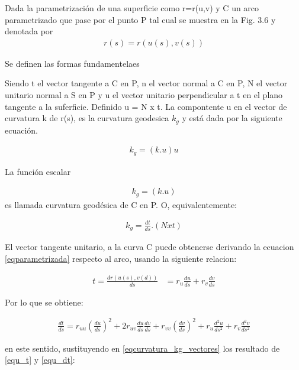 \documentclass{endm}
\begin{document}
Dada la parametrizaci\'on de una superficie como r=r(u,v) y  C un arco parametrizado que pase por el punto P tal cual se muestra en la Fig. 3.6 y denotada por
\begin{align} 
r(s) = r(u(s), v(s))
 \label{eqparametrizada}
\end{align}

Se definen las formas fundamentelaes

Siendo t el vector tangente a C en P, n el vector normal a C
en P, N el vector unitario normal a S en P y u el vector unitario perpendicular a t en el plano tangente a la suferficie. Definido u = N x t.
La compontente u en el vector de curvatura k de r(s), es la curvatura geodesica $k_g$ y est\'a dada por la siguiente ecuaci\'on.

\begin{align} 
k_g = (k.u)u
 \label{eqcurvatura_k_g}
\end{align}

La funci\'on escalar

\begin{align} 
k_g = (k.u)
 \label{eqcurvatura_kg}
\end{align}
es llamada curvatura geod\'esica de C en P.
O, equivalentemente:

\begin{align} 
k_g = \frac{dt}{ds} . (N x t)
 \label{eqcurvatura_kg_vectores}
\end{align}

El vector tangente unitario, a la curva C puede obtenerse derivando la ecuacion \ref{eqparametrizada} respecto al arco, usando la siguiente relacion:

\begin{align} 
t = \frac{d r(u(s), v(d))}{ds}&=r_u \frac{d u}{ds} + r_v \frac{d v}{ds}
 \label{equ_t}
\end{align}

Por lo que se obtiene:

\begin{align} 

 \frac{d t}{ds} = r_{uu} (\frac{d u}{ds})^2 +
 2 r_{uv} \frac{d u}{ds} \frac{d v}{ds}
 + r_{vv} (\frac{d v}{ds})^2 +
 r_u \frac{d^2 u}{ds^2} +
 r_v \frac{d^2 v}{ds^2}
 \label{equ_dt}
\end{align}

en este sentido, sustituyendo en \ref{eqcurvatura_kg_vectores} los resultado de \ref{equ_t} y \ref{equ_dt}:
\end{document}
